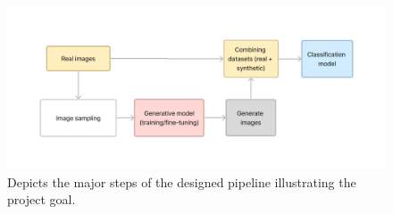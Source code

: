 \begin{figure}[H]
\centering
\includegraphics[width=\columnwidth]{main/content/images/diagrams/diagrama_objetivos.png}
\caption{Depicts the major steps of the designed pipeline illustrating the project goal.}
\label{fig:pipeline_diagram}
\end{figure}